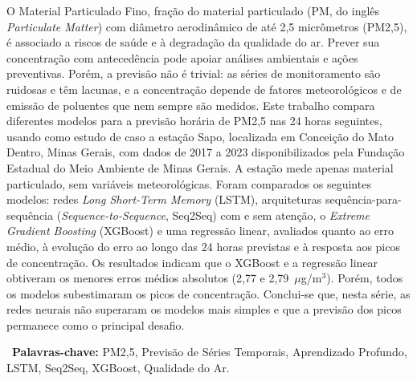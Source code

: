 O Material Particulado Fino, fração do material particulado (PM, do inglês \textit{Particulate Matter}) com diâmetro aerodinâmico de até 2,5 micrômetros (PM2,5), é associado a riscos de saúde e à degradação da qualidade do ar. Prever sua concentração com antecedência pode apoiar análises ambientais e ações preventivas. Porém, a previsão não é trivial: as séries de monitoramento são ruidosas e têm lacunas, e a concentração depende de fatores meteorológicos e de emissão de poluentes que nem sempre são medidos. Este trabalho compara diferentes modelos para a previsão horária de PM2,5 nas 24 horas seguintes, usando como estudo de caso a estação Sapo, localizada em Conceição do Mato Dentro, Minas Gerais, com dados de 2017 a 2023 disponibilizados pela Fundação Estadual do Meio Ambiente de Minas Gerais. A estação mede apenas material particulado, sem variáveis meteorológicas. Foram comparados os seguintes modelos: redes \textit{Long Short-Term Memory} (LSTM), arquiteturas sequência-para-sequência (\textit{Sequence-to-Sequence}, Seq2Seq) com e sem atenção, o \textit{Extreme Gradient Boosting} (XGBoost) e uma regressão linear, avaliados quanto ao erro médio, à evolução do erro ao longo das 24 horas previstas e à resposta aos picos de concentração. Os resultados indicam que o XGBoost e a regressão linear obtiveram os menores erros médios absolutos (2,77 e 2,79~\(\mu\)g/m\(^3\)). Porém, todos os modelos subestimaram os picos de concentração. Conclui-se que, nesta série, as redes neurais não superaram os modelos mais simples e que a previsão dos picos permanece como o principal desafio.

\noindent \ \textbf{Palavras-chave:} PM2,5, Previsão de Séries Temporais, Aprendizado Profundo, LSTM, Seq2Seq, XGBoost, Qualidade do Ar.

